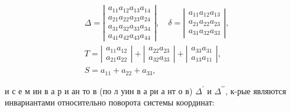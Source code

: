 \documentclass[10pt]{article}
\begin{document}
\[

\begin{aligned}

& \Delta=\left|\begin{array}{l}

a_{11} a_{12} a_{13} a_{14} \\

a_{21} a_{22} a_{23} a_{24} \\

a_{31} a_{32} a_{33} a_{34} \\

a_{41} a_{42} a_{43} a_{44}

\end{array}\right|, \quad \delta=\left|\begin{array}{l}

a_{11} a_{12} a_{13} \\

a_{21} a_{22} a_{23} \\

a_{31} a_{32} a_{33}

\end{array}\right|, \\

& T=\left|\begin{array}{l}

a_{11} a_{12} \\

a_{21} a_{22}

\end{array}\right|+\left|\begin{array}{l}

a_{22} a_{23} \\

a_{32} a_{33}

\end{array}\right|+\left|\begin{array}{l}

a_{33} a_{31} \\

a_{13} a_{11}

\end{array}\right|, \\

& S=a_{11}+a_{22}+a_{33},

\end{aligned}

\]



и с е м ин в а р и ан то в (по л уин в а ри а нт о в) $\Delta^{\prime}$ и $\Delta^{\prime \prime}$, к-рые являются инвариантами относительно поворота системы координат:
\end{document}

